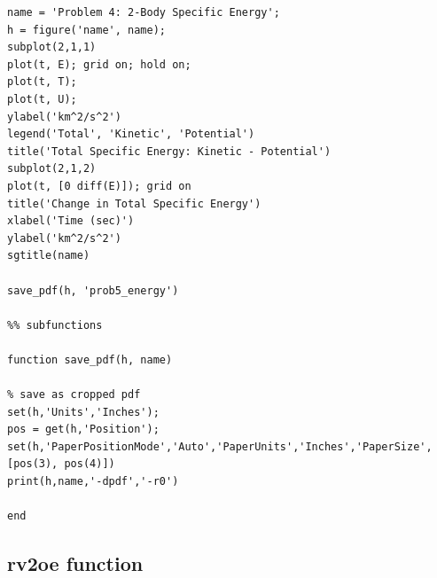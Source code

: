 \documentclass[conf]{new-aiaa}
\begin{document}
\begin{lstlisting}[basicstyle=\footnotesize]
name = 'Problem 4: 2-Body Specific Energy'; 
h = figure('name', name); 
subplot(2,1,1) 
plot(t, E); grid on; hold on; 
plot(t, T); 
plot(t, U); 
ylabel('km^2/s^2')
legend('Total', 'Kinetic', 'Potential') 
title('Total Specific Energy: Kinetic - Potential') 
subplot(2,1,2) 
plot(t, [0 diff(E)]); grid on 
title('Change in Total Specific Energy') 
xlabel('Time (sec)') 
ylabel('km^2/s^2')
sgtitle(name) 

save_pdf(h, 'prob5_energy')

%% subfunctions 

function save_pdf(h, name) 

% save as cropped pdf 
set(h,'Units','Inches');
pos = get(h,'Position');
set(h,'PaperPositionMode','Auto','PaperUnits','Inches','PaperSize',[pos(3), pos(4)])
print(h,name,'-dpdf','-r0')

end 
\end{lstlisting}

\subsection*{rv2oe function}
\end{document}
